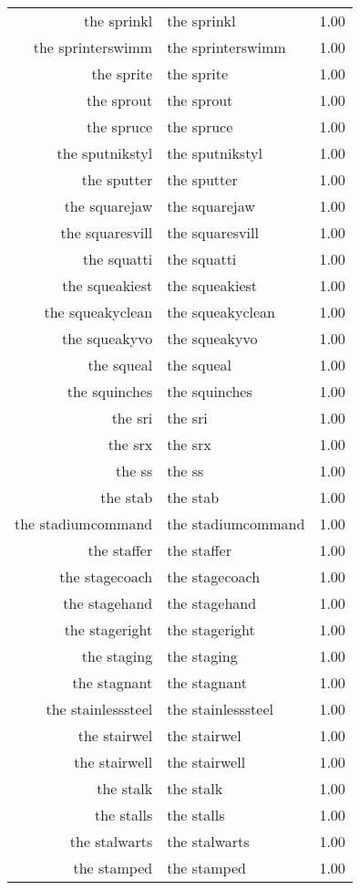 \begin{table}[ht]
\begin{tabular}{rlr}
  the sprinkl & the sprinkl & 1.00 \\ 
  the sprinterswimm & the sprinterswimm & 1.00 \\ 
  the sprite & the sprite & 1.00 \\ 
  the sprout & the sprout & 1.00 \\ 
  the spruce & the spruce & 1.00 \\ 
  the sputnikstyl & the sputnikstyl & 1.00 \\ 
  the sputter & the sputter & 1.00 \\ 
  the squarejaw & the squarejaw & 1.00 \\ 
  the squaresvill & the squaresvill & 1.00 \\ 
  the squatti & the squatti & 1.00 \\ 
  the squeakiest & the squeakiest & 1.00 \\ 
  the squeakyclean & the squeakyclean & 1.00 \\ 
  the squeakyvo & the squeakyvo & 1.00 \\ 
  the squeal & the squeal & 1.00 \\ 
  the squinches & the squinches & 1.00 \\ 
  the sri & the sri & 1.00 \\ 
  the srx & the srx & 1.00 \\ 
  the ss & the ss & 1.00 \\ 
  the stab & the stab & 1.00 \\ 
  the stadiumcommand & the stadiumcommand & 1.00 \\ 
  the staffer & the staffer & 1.00 \\ 
  the stagecoach & the stagecoach & 1.00 \\ 
  the stagehand & the stagehand & 1.00 \\ 
  the stageright & the stageright & 1.00 \\ 
  the staging & the staging & 1.00 \\ 
  the stagnant & the stagnant & 1.00 \\ 
  the stainlesssteel & the stainlesssteel & 1.00 \\ 
  the stairwel & the stairwel & 1.00 \\ 
  the stairwell & the stairwell & 1.00 \\ 
  the stalk & the stalk & 1.00 \\ 
  the stalls & the stalls & 1.00 \\ 
  the stalwarts & the stalwarts & 1.00 \\ 
  the stamped & the stamped & 1.00 \\ 

\end{tabular}
\end{table}
